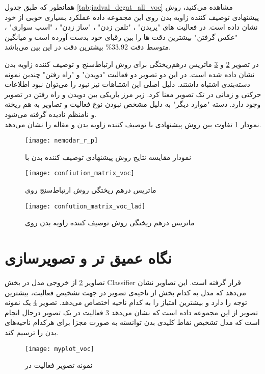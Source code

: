  همانطور که طبق جدول %
  \ref{tab:jadval_degat_all_voc}
  مشاهده می‌کنید، روش پیشنهادی توصیف کننده زاویه بدن روی این مجموعه داده عملکرد بسیاری خوبی از خود نشان داده است. در فعالیت های "پریدن" ، "تلفن زدن" ، "ساز زدن" ، "اسب سواری" ، "عکس گرفتن" بیشترین دقت ها را بین رقبای خود بدست آورده است و میانگین متوسط دقت 33.92\% بیشترین دقت در این بین می‌باشد.
  
  در تصویر %
\ref{fig: confiution_matrixvoc}
و 
\ref{fig: confution_matrix_voclad}
ماتریس درهم‌ریختگی برای روش ارتباط‌سنج و توصیف کننده زاویه بدن نشان داده شده است. در این دو تصویر دو فعالیت "دویدن" و "راه رفتن" چندین نمونه دسته‌بندی اشتباه داشتند. دلیل اصلی این اشتباهات نیز نبود را می‌توان نبود اطلاعات حرکتی و زمانی در تک تصویر معنا کرد. زیر مرز باریکی بین دویدن و راه رفتن در تصویر وجود دارد. دسته "موارد دیگر" به دلیل مشخص نبودن نوع فعالیت و تصاویر به هم ریخته و نامنظم نادیده گرفته می‌شود. \\
نمودار %
\ref{fig: nemodar_natije_relation_pish}
تفاوت بین روش پیشنهادی با توصیف کننده زاویه بدن و مقاله %
\cite{Human_object_relation_action}
را نشان می‌دهد.

\begin{figure}[ht]
	\centerline{\texttt{[image: nemodar\_r\_p]}}
	\caption{نمودار مقایسه نتایج روش پیشنهادی توصیف کننده بدن با }
	\label{fig: nemodar_natije_relation_pish}
\end{figure}
\begin{figure}[ht]
	\centerline{\texttt{[image: confiution\_matrix\_voc]}}
	\caption{ماتریس درهم ریختگی روش ارتباط‌سنج روی }
	\label{fig: confiution_matrixvoc}
\end{figure}
\begin{figure}[ht]
	\centerline{\texttt{[image: confution\_matrix\_voc\_lad]}}
	\caption{ماتریس درهم ریختگی روش توصیف کننده زاویه بدن روی }
	\label{fig: confution_matrix_voclad}
\end{figure}
\section{نگاه عمیق تر و تصویرسازی}\label{amig_negah}
تصاویر %
\ref{fig: confiution_matrixvoc}
از خروجی مدل در بخش %
\gls{Classifier}
قرار گرفته است. این تصاویر نشان می‌دهد که مدل به کدام بخش از ناحیه‌ی تصویر در جهت تشخیص فعالیت،‌ بیشترین توجه را دارد و بیشترین امتیاز را به کدام ناحیه اختصاص می‌دهد.
تصویر %
\ref{fig: myplot_voc}
یک نمونه تصویر از این مجموعه داده است که نشان می‌دهد 3 فعالیت در یک تصویر درحال انجام است که مدل تشخیص نقاط کلیدی بدن توانسته به صورت مجزا برای هرکدام ناحیه‌های بدن را ترسیم کند.
\begin{figure}[ht]
	\centerline{\texttt{[image: myplot\_voc]}}
	\caption{نمونه تصویر فعالیت در }
	\label{fig: myplot_voc}
\end{figure}

